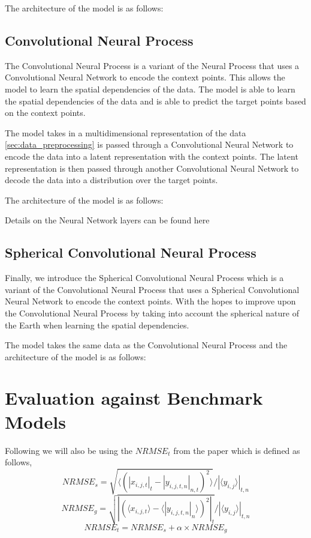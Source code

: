 \documentclass{article} %
\begin{document}
The architecture of the model is as follows:

\subsection*{Convolutional Neural Process}
The Convolutional Neural Process is a variant of the Neural Process that uses a Convolutional Neural Network to encode the context points. This allows the model to learn the spatial dependencies of the data. The model is able to learn the spatial dependencies of the data and is able to predict the target points based on the context points.

The model takes in a multidimensional representation of the data \ref{sec:data_preprocessing} is passed through a Convolutional Neural Network to encode the data into a latent representation with the context points. The latent representation is then passed through another Convolutional Neural Network to decode the data into a distribution over the target points.

The architecture of the model is as follows:


Details on the Neural Network layers can be found here 

\subsection*{Spherical Convolutional Neural Process}
Finally, we introduce the Spherical Convolutional Neural Process which is a variant of the Convolutional Neural Process that uses a Spherical Convolutional Neural Network to encode the context points. With the hopes to improve upon the Convolutional Neural Process by taking into account the spherical nature of the Earth when learning the spatial dependencies.

The model takes the same data as the Convolutional Neural Process and the architecture of the model is as follows:




\section{Evaluation against Benchmark Models}
\label{sec:evaluation_metric}
Following \cite{watson2022climatebench} we will also be using the $NRMSE_t$ from the paper which is defined as follows,
\begin{equation}
    NRMSE_s = \sqrt{\langle(|x_{i, j, t}|_t - |y_{i, j, t, n}|_{n, t})^2\rangle}/|\langle y_{i, j}\rangle|_{t, n}
\end{equation}
\begin{equation}
    NRMSE_g = \sqrt{|(\langle x_{i, j, t}\rangle - \langle|y_{i, j, t, n}|_n\rangle)^2|_t} / |\langle y_{i, j} \rangle|_{t, n}
\end{equation}
\begin{equation}
    NRMSE_t = NRMSE_s + \alpha \times NRMSE_g
\end{equation}
\end{document}
